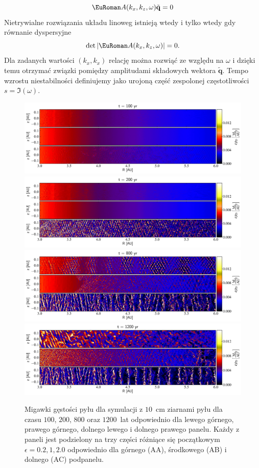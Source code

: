 \begin{equation}
 \eurom{A}(k_x,k_z,\omega)\tilde{\mathbf{q}} = 0
 \label{eq:linset}
\end{equation}
%
Nietrywialne rozwiązania układu linoweg  istnieją wtedy i tylko
wtedy gdy równanie dyspersyjne 
\begin{equation}
 \det|\eurom{A}(k_x,k_z,\omega)|=0.
 \label{eq:disprel}
\end{equation}
%
Dla zadanych wartości $(k_x, k_x)$ relację  można rozwiąć ze
względu na $\omega$ i dzięki temu otrzymać związki pomiędzy amplitudami
składowych wektora $\tilde{\mathbf{q}}$.
Tempo wzrostu niestabilności definiujemy jako urojoną część zespolonej
częstotliwości $s=\Im(\omega)$.
%
\begin{figure}
   \centering
   \includegraphics[width=0.99\linewidth]{figures/fig2a}
   \includegraphics[width=0.99\linewidth]{figures/fig2b}
   \includegraphics[width=0.99\linewidth]{figures/fig2c}
   \includegraphics[width=0.99\linewidth]{figures/fig2d}
   \caption{Migawki gęstości pyłu dla symulacji z $10$~cm ziarnami pyłu
      dla czasu $100$, $200$, $800$ oraz $1200$~lat odpowiednio dla lewego
      górnego, prawego górnego, dolnego lewego i dolnego prawego panelu.
      Każdy z paneli jest podzielony na trzy części różniące się początkowym 
      $\epsilon = 0.2, 1, 2.0$ odpowiednio dla górnego (AA), środkowego (AB) i
      dolnego (AC) podpanelu.}
   \label{fig2}
\end{figure}

